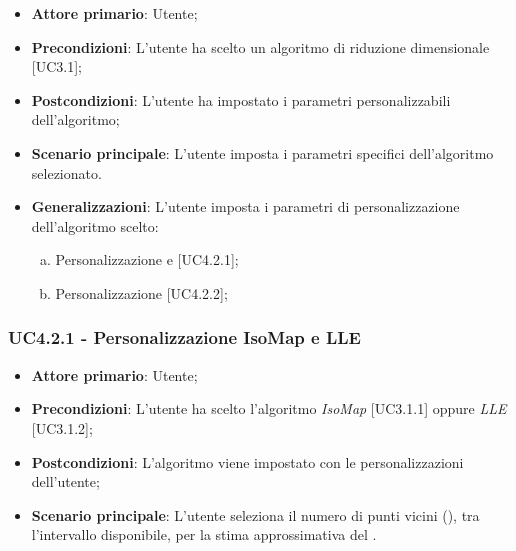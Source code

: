\begin{itemize}
	\item \textbf{Attore primario}: Utente;
	
	\item \textbf{Precondizioni}: L'utente ha scelto un algoritmo di riduzione dimensionale [UC3.1];
	
	\item \textbf{Postcondizioni}: L'utente ha impostato i parametri personalizzabili dell'algoritmo;
	
	\item \textbf{Scenario principale}: L'utente imposta i parametri specifici dell'algoritmo selezionato.
	
		\item \textbf{Generalizzazioni}: L'utente imposta i parametri di personalizzazione dell'algoritmo scelto:
	\begin{enumerate}[(a)]
		\item Personalizzazione  e  [UC4.2.1];
		\item Personalizzazione  [UC4.2.2];
	\end{enumerate}
\end{itemize}		
		

\subsubsection{UC4.2.1 - Personalizzazione IsoMap e LLE}
\begin{itemize}
	\item \textbf{Attore primario}: Utente;
	
	\item \textbf{Precondizioni}: L'utente ha scelto l'algoritmo \textit{IsoMap} [UC3.1.1] oppure \textit{LLE} [UC3.1.2];
	
	\item \textbf{Postcondizioni}: L'algoritmo viene impostato con le personalizzazioni dell'utente;
	
	\item \textbf{Scenario principale}: L'utente seleziona il numero di punti vicini (), tra l'intervallo disponibile, per la stima approssimativa del .

\end{itemize}

